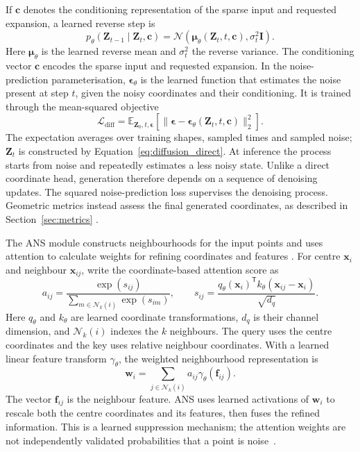 If $\mathbf c$ denotes the conditioning representation of the sparse
input and requested expansion, a learned reverse step is
\begin{equation}
 p_\theta(\mathbf Z_{t-1}\mid\mathbf Z_t,\mathbf c)
 =\mathcal N(\boldsymbol\mu_\theta(\mathbf Z_t,t,\mathbf c),
 \sigma_t^2\mathbf I).
 \label{eq:diffusion_reverse}
\end{equation}
Here $\boldsymbol\mu_\theta$ is the learned reverse mean and $\sigma_t^2$
the reverse variance. The conditioning vector $\mathbf c$ encodes the
sparse input and requested expansion. In the noise-prediction
parameterisation, $\boldsymbol\epsilon_\theta$ is the learned function
that estimates the noise present at step $t$, given the noisy coordinates
and their conditioning. It is trained through the mean-squared objective
\begin{equation}
 \mathcal L_\mathrm{diff}=\mathbb E_{\mathbf Z_0,t,\boldsymbol\epsilon}
 \left[\|\boldsymbol\epsilon-
 \boldsymbol\epsilon_\theta(\mathbf Z_t,t,\mathbf c)\|_2^2\right].
 \label{eq:diffusion_loss}
\end{equation}
The expectation averages over training shapes, sampled times and sampled
noise; $\mathbf Z_t$ is constructed by Equation~\eqref{eq:diffusion_direct}.
At inference the process starts from noise and repeatedly estimates a
less noisy state. Unlike a direct coordinate head, generation therefore
depends on a sequence of denoising updates. The squared noise-prediction
loss supervises the denoising process. Geometric metrics instead assess
the final generated coordinates, as described in Section~\ref{sec:metrics}
\cite{zhang2025pdans,ho2020ddpm}.

The ANS module constructs neighbourhoods for the input points and uses attention
to calculate weights for refining coordinates and features
\cite{zhang2025pdans}. For centre $\mathbf x_i$ and neighbour
$\mathbf x_{ij}$, write the coordinate-based attention score as
\begin{equation}
 a_{ij}=\frac{\exp(s_{ij})}{\sum_{m\in\mathcal N_k(i)}\exp(s_{im})},
 \qquad s_{ij}=\frac{q_\theta(\mathbf x_i)^{\mathsf T}
 k_\theta(\mathbf x_{ij}-\mathbf x_i)}{\sqrt{d_q}}.
 \label{eq:pdans_attention}
\end{equation}
Here $q_\theta$ and $k_\theta$ are learned coordinate transformations,
$d_q$ is their channel dimension, and $\mathcal N_k(i)$ indexes the $k$
neighbours. The query uses the centre coordinates and the key uses
relative neighbour coordinates. With a learned linear feature transform
$\gamma_\theta$, the weighted neighbourhood representation is
\begin{equation}
 \mathbf w_i=\sum_{j\in\mathcal N_k(i)}a_{ij}\gamma_\theta(\mathbf f_{ij}).
 \label{eq:pdans_weights}
\end{equation}
The vector $\mathbf f_{ij}$ is the neighbour feature. ANS uses learned
activations of $\mathbf w_i$ to rescale both the centre coordinates and
its features, then fuses the refined information. This is a learned
suppression mechanism; the attention weights are not independently
validated probabilities that a point is noise~\cite{zhang2025pdans}.

